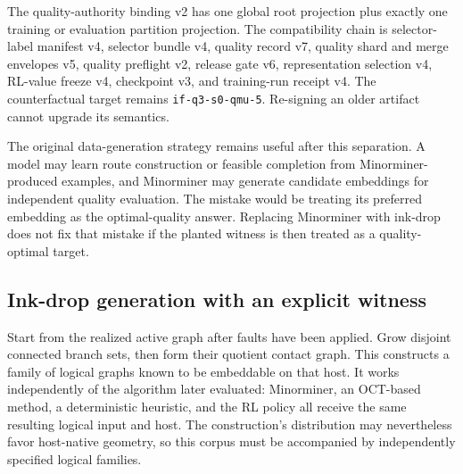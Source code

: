 \documentclass[11pt,a4paper]{article}
\newcommand{\code}[1]{\texttt{\small #1}}
\theoremstyle{definition}\newtheorem{definition}[proposition]{Definition}
\begin{document}
The quality-authority binding v2 has one global root projection plus exactly one training or evaluation partition projection. The compatibility chain is selector-label manifest v4, selector bundle v4, quality record v7, quality shard and merge envelopes v5, quality preflight v2, release gate v6, representation selection v4, RL-value freeze v4, checkpoint v3, and training-run receipt v4. The counterfactual target remains \code{if-q3-s0-qmu-5}. Re-signing an older artifact cannot upgrade its semantics.

The original data-generation strategy remains useful after this separation. A model may learn route construction or feasible completion from Minorminer-produced examples, and Minorminer may generate candidate embeddings for independent quality evaluation. The mistake would be treating its preferred embedding as the optimal-quality answer. Replacing Minorminer with ink-drop does not fix that mistake if the planted witness is then treated as a quality-optimal target.

\subsection{Ink-drop generation with an explicit witness}
\label{data:inkdrop}

Start from the realized active graph after faults have been applied. Grow disjoint connected branch sets, then form their quotient contact graph. This constructs a family of logical graphs known to be embeddable on that host. It works independently of the algorithm later evaluated: Minorminer, an OCT-based method, a deterministic heuristic, and the RL policy all receive the same resulting logical input and host. The construction's distribution may nevertheless favor host-native geometry, so this corpus must be accompanied by independently specified logical families.
\end{document}

